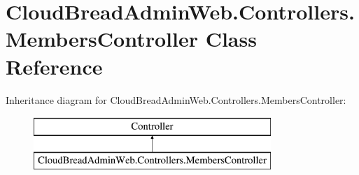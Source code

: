\hypertarget{a00146}{}\section{Cloud\+Bread\+Admin\+Web.\+Controllers.\+Members\+Controller Class Reference}
\label{a00146}
Inheritance diagram for Cloud\+Bread\+Admin\+Web.\+Controllers.\+Members\+Controller\+:\begin{figure}[H]
\begin{center}
\leavevmode
\includegraphics[height=2.000000cm]{a00146}
\end{center}
\end{figure}
